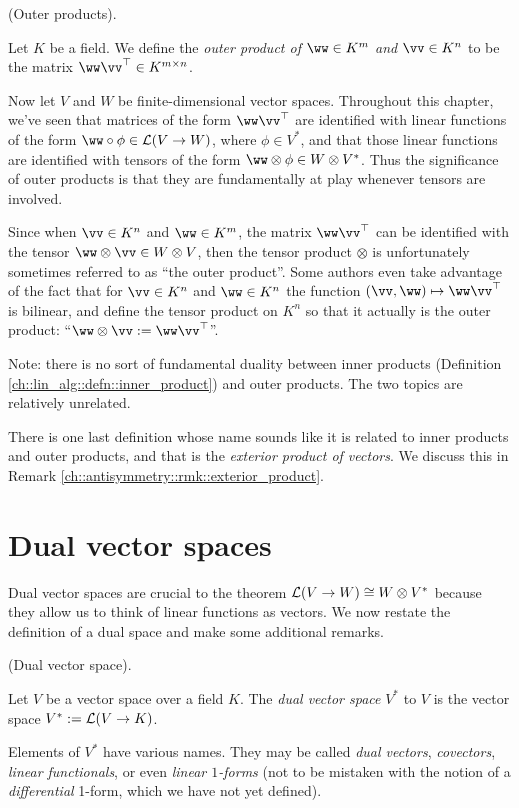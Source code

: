 \begin{defn}
\label{ch::motivated_intro::rmk::outer_products}
    (Outer products).

    Let $K$ be a field. We define the \textit{outer product of $\ww \in K^m$ and $\vv \in K^n$} to be the matrix $\ww \vv^\top \in K^{m \times n}$. 
    
    Now let $V$ and $W$ be finite-dimensional vector spaces. Throughout this chapter, we've seen that matrices of the form $\ww \vv^\top$ are identified with linear functions of the form $\ww \circ \phi \in \LLLL(V \rightarrow W)$, where $\phi \in V^*$, and that those linear functions are identified with tensors of the form $\ww \otimes \phi \in W \otimes V^*$. Thus the significance of outer products is that they are fundamentally at play whenever tensors are involved.
    
    Since when $\vv \in K^n$ and $\ww \in K^m$, the matrix $\ww \vv^\top$ can be identified with the tensor $\ww \otimes \vv \in W \otimes V$, then the tensor product $\otimes$ is unfortunately sometimes referred to as ``the outer product''. Some authors even take advantage of the fact that for $\vv \in K^n$ and $\ww \in K^n$ the function $(\vv, \ww) \mapsto \ww \vv^\top$ is bilinear, and define the tensor product on $K^n$ so that it actually is the outer product: ``$\ww \otimes \vv := \ww \vv^\top$''.

    Note: there is no sort of fundamental duality between inner products (Definition \ref{ch::lin_alg::defn::inner_product}) and outer products. The two topics are relatively unrelated.

    There is one last definition whose name sounds like it is related to inner products and outer products, and that is the \textit{exterior product of vectors}. We discuss this in Remark \ref{ch::antisymmetry::rmk::exterior_product}.
\end{defn}

\newpage

\section{Dual vector spaces}

Dual vector spaces are crucial to the theorem $\mathcal{L}(V \rightarrow W) \cong W \otimes V^*$ because they allow us to think of linear functions as vectors. We now restate the definition of a dual space and make some additional remarks.

\begin{defn}
\label{ch::motivated_intro::defn::dual_space_2}
    (Dual vector space).
    
    Let $V$ be a vector space over a field $K$. The \textit{dual vector space} $V^*$ to $V$ is the vector space $V^* := \mathcal{L}(V \rightarrow K)$.

    Elements of $V^*$ have various names. They may be called \textit{dual vectors}, \textit{covectors}, \textit{linear functionals}, or even \textit{linear $1$-forms} (not to be mistaken with the notion of a \textit{differential} 1-form, which we have not yet defined).
\end{defn}

